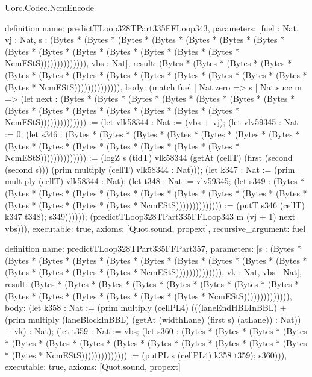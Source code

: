 \begin{lexlean}{Uorc.Codec.NcmEncode}
\begin{semanticmodule}
definition{
  name: predictTLoop328TPart335FFLoop343,
  parameters: [fuel : Nat, vj : Nat, s : (Bytes * (Bytes * (Bytes * (Bytes * (Bytes * (Bytes * (Bytes * (Bytes * (Bytes * (Bytes * (Bytes * (Bytes * (Bytes * (Bytes * NcmEStS)))))))))))))), vbs : Nat],
  result: (Bytes * (Bytes * (Bytes * (Bytes * (Bytes * (Bytes * (Bytes * (Bytes * (Bytes * (Bytes * (Bytes * (Bytes * (Bytes * (Bytes * NcmEStS)))))))))))))),
  body: (match fuel
    | Nat.zero => s
    | Nat.succ m => (let next : (Bytes * (Bytes * (Bytes * (Bytes * (Bytes * (Bytes * (Bytes * (Bytes * (Bytes * (Bytes * (Bytes * (Bytes * (Bytes * (Bytes * NcmEStS)))))))))))))) := (let vlk58344 : Nat := (vbs + vj); (let vlv59345 : Nat := 0; (let s346 : (Bytes * (Bytes * (Bytes * (Bytes * (Bytes * (Bytes * (Bytes * (Bytes * (Bytes * (Bytes * (Bytes * (Bytes * (Bytes * (Bytes * NcmEStS)))))))))))))) := (logZ s (tidT) vlk58344 (getAt (cellT) (first (second (second s))) (prim multiply (cellT) vlk58344 : Nat))); (let k347 : Nat := (prim multiply (cellT) vlk58344 : Nat); (let t348 : Nat := vlv59345; (let s349 : (Bytes * (Bytes * (Bytes * (Bytes * (Bytes * (Bytes * (Bytes * (Bytes * (Bytes * (Bytes * (Bytes * (Bytes * (Bytes * (Bytes * NcmEStS)))))))))))))) := (putT s346 (cellT) k347 t348); s349)))))); (predictTLoop328TPart335FFLoop343 m (vj + 1) next vbs))),
  executable: true,
  axioms: [Quot.sound, propext],
  recursive_argument: fuel
}

definition{
  name: predictTLoop328TPart335FFPart357,
  parameters: [s : (Bytes * (Bytes * (Bytes * (Bytes * (Bytes * (Bytes * (Bytes * (Bytes * (Bytes * (Bytes * (Bytes * (Bytes * (Bytes * (Bytes * NcmEStS)))))))))))))), vk : Nat, vbs : Nat],
  result: (Bytes * (Bytes * (Bytes * (Bytes * (Bytes * (Bytes * (Bytes * (Bytes * (Bytes * (Bytes * (Bytes * (Bytes * (Bytes * (Bytes * NcmEStS)))))))))))))),
  body: (let k358 : Nat := (prim multiply (cellPL4) (((laneEndHBLInBBL) + (prim multiply (laneBlockInBBL) (getAt (widthLane) (first s) (atLane)) : Nat)) + vk) : Nat); (let t359 : Nat := vbs; (let s360 : (Bytes * (Bytes * (Bytes * (Bytes * (Bytes * (Bytes * (Bytes * (Bytes * (Bytes * (Bytes * (Bytes * (Bytes * (Bytes * (Bytes * NcmEStS)))))))))))))) := (putPL s (cellPL4) k358 t359); s360))),
  executable: true,
  axioms: [Quot.sound, propext]
}


\end{semanticmodule}
\end{lexlean}
